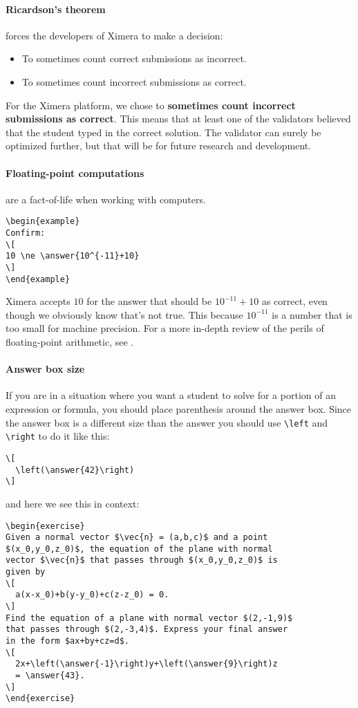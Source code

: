 \documentclass{ximera}
\begin{document}
\paragraph{Ricardson's theorem} forces the developers of Ximera to make a
decision:
\begin{itemize}
  \item To sometimes count correct submissions as incorrect.
  \item To sometimes count incorrect submissions as correct.
\end{itemize}
For the Ximera platform, we chose to \textbf{sometimes count incorrect
  submissions as correct}. This means that at least one of the validators
believed that the student typed in the correct solution. The validator can
surely be optimized further, but that will be for future research and
development.

\paragraph{Floating-point computations} are a fact-of-life when working with
computers.

\begin{verbatim}
\begin{example}
Confirm:
\[
10 \ne \answer{10^{-11}+10}
\]
\end{example}
\end{verbatim}

Ximera accepts $10$ for the answer that should be $10^{-11}+10$  as correct,
even though we obviously know that's not
true.  This because $10^{-11}$ is a number that is too small for machine
precision. For a more in-depth review of the perils of floating-point
arithmetic, see .

\paragraph{Answer box size}
If you are in a situation where you want a student to solve for a portion
of an expression or formula, you should place parenthesis around the answer
box. Since the answer box is a different size than the answer you should use
\verb!\left! and \verb!\right! to do it like
this:
\begin{verbatim}
\[
  \left(\answer{42}\right)
\]
\end{verbatim}
and here we see this in context:
\begin{verbatim}
\begin{exercise}
Given a normal vector $\vec{n} = (a,b,c)$ and a point
$(x_0,y_0,z_0)$, the equation of the plane with normal
vector $\vec{n}$ that passes through $(x_0,y_0,z_0)$ is
given by
\[
  a(x-x_0)+b(y-y_0)+c(z-z_0) = 0.
\]
Find the equation of a plane with normal vector $(2,-1,9)$
that passes through $(2,-3,4)$. Express your final answer
in the form $ax+by+cz=d$.
\[
  2x+\left(\answer{-1}\right)y+\left(\answer{9}\right)z
  = \answer{43}.
\]
\end{exercise}
\end{verbatim}
\end{document}
